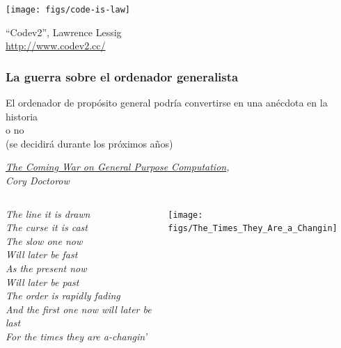 \documentclass[17pt,aspectratio=169]{beamer}
\begin{document}
\begin{frame}[fragile]

  \begin{center}
  \texttt{[image: figs/code-is-law]}
  \end{center}

  \begin{flushright}
``Codev2'', Lawrence Lessig \\
\url{http://www.codev2.cc/}
\end{flushright}

\end{frame}



\begin{frame}
\frametitle{La guerra sobre el ordenador generalista}

\begin{center}
El ordenador de propósito general podría convertirse en una anécdota en la historia \\
o no
\\
(se decidirá durante los próximos años) \\
\end{center}

\begin{flushright}
{\em \href{http://boingboing.net/2011/12/27/the-coming-war-on-general-purp.html}{The Coming War on General Purpose Computation}, \\
  Cory Doctorow} \\
\end{flushright}

\end{frame}


\begin{frame}[fragile]

\begin{columns}
  \begin{column}{0.7\textwidth}
    {\em \small
    The line it is drawn \\
    The curse it is cast \\
    The slow one now \\
    Will later be fast \\
    As the present now \\
    Will later be past \\
    The order is rapidly fading \\
    And the first one now will later be last \\
    For the times they are a-changin' \\
    }
  \end{column}
  \begin{column}{0.3\textwidth}  %
    \begin{center}
      \texttt{[image: figs/The\_Times\_They\_Are\_a\_Changin]}
    \end{center}
  \end{column}
\end{columns}
  
\end{frame}
\end{document}
